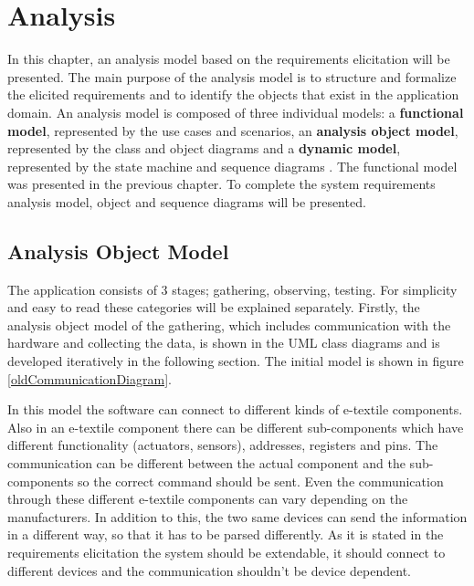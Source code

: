 \chapter{Analysis}

	In this chapter, an analysis model based on the requirements elicitation will be presented. The main purpose of the analysis model is to structure and formalize the elicited requirements and to identify the objects that exist in the application domain. An analysis model is composed of three individual models: a \textbf{functional model}, represented by the use cases and scenarios, an \textbf{analysis object model}, represented by the class and object diagrams and a \textbf{dynamic model}, represented by the state machine and sequence diagrams \cite{Bruegge2004}. The functional model was presented in the previous chapter. To complete the system requirements analysis model, object and sequence diagrams will be presented.

	
\section{Analysis Object Model}

	The application consists of 3 stages; gathering, observing, testing. For simplicity and easy to read these categories will be explained separately. Firstly, the analysis object model of the gathering, which includes communication with the hardware and collecting the data, is shown in the UML class diagrams and is developed iteratively in the following section. The initial model is shown in figure \ref{oldCommunicationDiagram}.




In this model the software can connect to different kinds of e-textile components. Also in an e-textile component there can be different sub-components which have different functionality (actuators, sensors), addresses, registers and pins. The communication can be different between the actual component and the sub-components so the correct command should be sent. Even the communication through these different e-textile components can vary depending on the manufacturers. In addition to this, the two same devices can send the information in a different way, so that it has to be parsed differently. As it is stated in the requirements elicitation the system should be extendable, it should connect to different devices and the communication shouldn't be device dependent. \\

